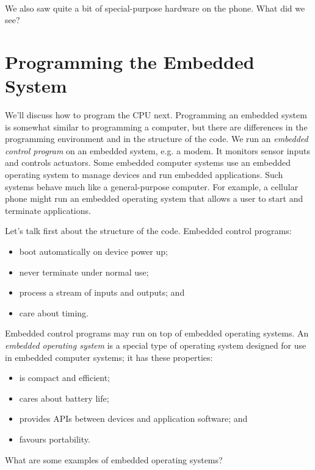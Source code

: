 ~\\[1em]

We also saw quite a bit of special-purpose hardware on the phone. What did we see?


\section*{Programming the Embedded System}
We'll discuss how to program the CPU next. Programming an embedded
system is somewhat similar to programming a computer, but there are
differences in the programming environment and in the structure of the
code.
We run an \emph{embedded control program} on an embedded system, e.g. a modem. It monitors
sensor inputs and controls actuators. Some embedded computer systems use an embedded operating system to manage devices and run embedded applications.  Such systems behave much like a general-purpose computer.  For example, a cellular phone might run an embedded operating system that allows a user to start and terminate applications.

Let's talk first about the structure of the code. Embedded control programs:
\begin{itemize}
\item boot automatically on device power up;
\item never terminate under normal use;
\item process a stream of inputs and outputs; and
\item care about timing.
\end{itemize}

Embedded control programs may run on top of embedded operating systems.
An \emph{embedded operating system} is a special type of operating system designed for use in embedded computer systems; it has these properties:
\begin{itemize}
\item is compact and efficient;
\item cares about battery life;
\item provides APIs between devices and application software; and
\item favours portability.
\end{itemize}

{\sf What are some examples of embedded operating systems?}
\vspace{5em}

